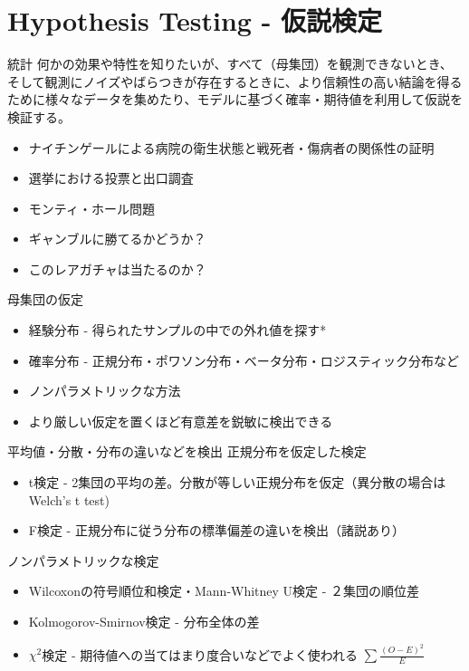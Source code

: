 \documentclass[cjk, aspectratio=169]{beamer}
\begin{document}
\section{Hypothesis Testing - 仮説検定}
    \begin{frame}{統計}
    何かの効果や特性を知りたいが、すべて（母集団）を観測できないとき、そして観測にノイズやばらつきが存在するときに、より信頼性の高い結論を得るために様々なデータを集めたり、モデルに基づく確率・期待値を利用して仮説を検証する。
    \begin{itemize}
    \item ナイチンゲールによる病院の衛生状態と戦死者・傷病者の関係性の証明
    \item 選挙における投票と出口調査
    \item モンティ・ホール問題
    \item ギャンブルに勝てるかどうか？
    \item このレアガチャは当たるのか？
    \end{itemize}
    \end{frame}

    \begin{frame}{母集団の仮定}
    \begin{itemize}
    \item 経験分布 - 得られたサンプルの中での外れ値を探す*
    \item 確率分布 - 正規分布・ポワソン分布・ベータ分布・ロジスティック分布など
    \item ノンパラメトリックな方法
    \item より厳しい仮定を置くほど有意差を鋭敏に検出できる
    \end{itemize}
    \end{frame}

    \begin{frame}{平均値・分散・分布の違いなどを検出}
    正規分布を仮定した検定
    \begin{itemize}
    \item t検定 - 2集団の平均の差。分散が等しい正規分布を仮定（異分散の場合はWelch's t test)
    \item F検定 - 正規分布に従う分布の標準偏差の違いを検出（諸説あり）
    \end{itemize}
    ノンパラメトリックな検定
    \begin{itemize}
    \item Wilcoxonの符号順位和検定・Mann-Whitney U検定 - ２集団の順位差
    \item Kolmogorov-Smirnov検定 - 分布全体の差
    \item $\chi^{2}$検定 - 期待値への当てはまり度合いなどでよく使われる $\sum \frac{(O-E)^2}{E}$
    \end{itemize}
    \end{frame}
\end{document}
